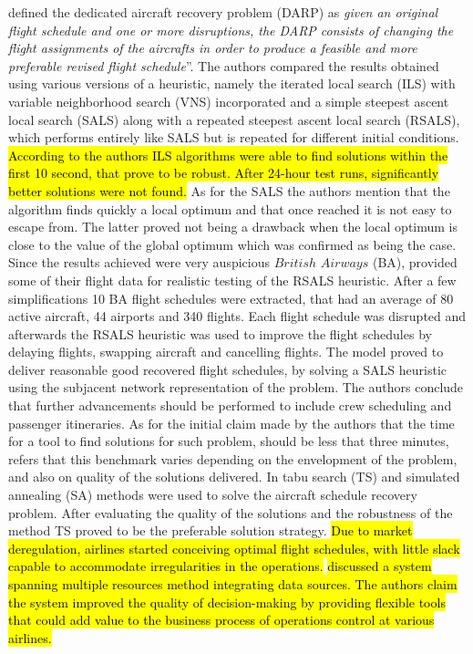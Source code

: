\documentclass[ijoo,nonblindrev]{informs-ijoo}
\begin{document}
\citep{Love2001} defined the dedicated aircraft recovery problem (DARP) as \textit{given an original flight schedule and one or more disruptions, the DARP consists of changing  the flight assignments of the aircrafts in order to produce a feasible and more preferable revised flight schedule}”. The authors compared the results obtained using various versions of a heuristic, namely the iterated local search (ILS) with variable neighborhood search (VNS) incorporated and a simple steepest ascent local search (SALS) along with a repeated steepest ascent local search (RSALS), which performs entirely like SALS but is repeated for different initial conditions. \hl{According to the authors ILS algorithms were able to find solutions within the first 10 second, that prove to be robust. After 24-hour test runs, significantly better solutions were not found.} As for the SALS the authors mention that the algorithm finds quickly a local optimum and that once reached it is not easy to escape from. The latter proved not being a drawback when the local optimum is close to the value of the global optimum which was confirmed as being the case. Since the results achieved were very auspicious $British$ $Airways$ (BA), provided some of their flight data for realistic testing of the RSALS heuristic. After a few simplifications 10 BA flight schedules were extracted, that had an average of 80 active aircraft, 44 airports and 340 flights. Each flight schedule was disrupted and afterwards the RSALS heuristic was used to improve the flight schedules by delaying flights, swapping aircraft and cancelling flights.  The model proved to deliver reasonable good recovered flight schedules, by solving a SALS heuristic using the subjacent network representation of the problem. The authors conclude that further advancements should be performed to include crew scheduling and passenger itineraries.   As for the initial claim made by the authors that the time for a tool to find solutions for such problem, should be less that three minutes, \citep{Andersson:2006} refers that this benchmark varies depending on the envelopment of the problem, and also on quality of the solutions delivered.
In \citep{Andersson:2006} tabu search (TS) and simulated annealing (SA) methods were used to solve the aircraft schedule recovery problem. After evaluating the quality of the solutions and the robustness of the method TS proved to be the preferable solution strategy.
\hl{Due to market deregulation, airlines started conceiving optimal flight schedules, with little slack capable to accommodate irregularities in the operations.} \citep{Kohl2007149} \hl{discussed a system spanning multiple resources method integrating data sources. The authors claim the system improved the quality of decision-making by providing flexible tools that could add value to the business process of operations control at various airlines.}\\
\end{document}

